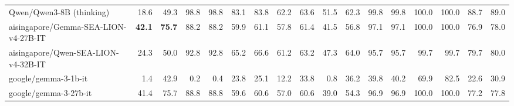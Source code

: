 \documentclass{article}
\begin{document}
\begin{table}[htbp]
\begin{threeparttable}
\begin{adjustbox}{max width=\textwidth}
\begin{tabular}{lrrrrrrrrrrrrrrrr}
Qwen/Qwen3-8B (thinking) & \cellcolor[HTML]{FDF4F0}18.6 & \cellcolor[HTML]{EFF6FA}49.3 & \cellcolor[HTML]{93C5DE}98.8 & \cellcolor[HTML]{93C5DE}98.8 & \cellcolor[HTML]{A1CDE2}83.1 & \cellcolor[HTML]{A5CFE4}83.8 & \cellcolor[HTML]{ADD3E6}62.2 & \cellcolor[HTML]{B1D5E7}63.6 & \cellcolor[HTML]{95C6DF}51.5 & \cellcolor[HTML]{A4CEE3}62.3 & \cellcolor[HTML]{92C5DE}99.8 & \cellcolor[HTML]{92C5DE}99.8 & \cellcolor[HTML]{92C5DE}100.0 & \cellcolor[HTML]{92C5DE}100.0 & \cellcolor[HTML]{9AC9E0}88.7 & \cellcolor[HTML]{9CCAE1}89.0 \\
aisingapore/Gemma-SEA-LION-v4-27B-IT & \cellcolor[HTML]{92C5DE}\textbf{42.1} & \cellcolor[HTML]{92C5DE}\textbf{75.7} & \cellcolor[HTML]{AAD2E5}88.2 & \cellcolor[HTML]{AAD2E5}88.2 & \cellcolor[HTML]{D9EBF3}59.9 & \cellcolor[HTML]{EFF6FA}61.1 & \cellcolor[HTML]{BBDAEA}57.8 & \cellcolor[HTML]{B8D9E9}61.4 & \cellcolor[HTML]{BFDDEB}41.5 & \cellcolor[HTML]{BEDCEB}56.8 & \cellcolor[HTML]{98C8DF}97.1 & \cellcolor[HTML]{9BCAE0}97.1 & \cellcolor[HTML]{92C5DE}100.0 & \cellcolor[HTML]{92C5DE}100.0 & \cellcolor[HTML]{B6D8E9}76.9 & \cellcolor[HTML]{B9DAEA}78.0 \\
aisingapore/Qwen-SEA-LION-v4-32B-IT & \cellcolor[HTML]{EEF6F9}24.3 & \cellcolor[HTML]{EDF5F9}50.0 & \cellcolor[HTML]{A0CCE2}92.8 & \cellcolor[HTML]{A0CCE2}92.8 & \cellcolor[HTML]{CCE4EF}65.2 & \cellcolor[HTML]{DDEDF4}66.6 & \cellcolor[HTML]{B0D5E7}61.2 & \cellcolor[HTML]{B2D6E7}63.2 & \cellcolor[HTML]{A6D0E4}47.3 & \cellcolor[HTML]{9CCAE1}64.0 & \cellcolor[HTML]{9BC9E0}95.7 & \cellcolor[HTML]{A0CCE2}95.7 & \cellcolor[HTML]{92C5DE}99.7 & \cellcolor[HTML]{94C6DE}99.7 & \cellcolor[HTML]{B0D5E7}79.7 & \cellcolor[HTML]{B4D7E8}80.0 \\
google/gemma-3-1b-it & \cellcolor[HTML]{F4AB8A}1.4 & \cellcolor[HTML]{FEF8F6}42.9 & \cellcolor[HTML]{F4A582}0.2 & \cellcolor[HTML]{F4A582}0.4 & \cellcolor[HTML]{F9D4C4}23.8 & \cellcolor[HTML]{F4AB8A}25.1 & \cellcolor[HTML]{F7C3AC}12.2 & \cellcolor[HTML]{FCEAE2}33.8 & \cellcolor[HTML]{F4A785}0.8 & \cellcolor[HTML]{FBE1D6}36.2 & \cellcolor[HTML]{FCECE5}39.8 & \cellcolor[HTML]{F5B598}40.2 & \cellcolor[HTML]{D3E7F1}69.9 & \cellcolor[HTML]{FDF6F3}82.5 & \cellcolor[HTML]{F9D0BE}22.6 & \cellcolor[HTML]{F9D1BF}30.9 \\
google/gemma-3-27b-it & \cellcolor[HTML]{95C6DF}41.4 & \cellcolor[HTML]{92C5DE}75.7 & \cellcolor[HTML]{A9D1E5}88.8 & \cellcolor[HTML]{A9D1E5}88.8 & \cellcolor[HTML]{DAEBF3}59.6 & \cellcolor[HTML]{F1F7FA}60.6 & \cellcolor[HTML]{BDDCEB}57.0 & \cellcolor[HTML]{BBDBEA}60.6 & \cellcolor[HTML]{C9E2EE}39.0 & \cellcolor[HTML]{CAE3EF}54.3 & \cellcolor[HTML]{98C8DF}96.9 & \cellcolor[HTML]{9CCAE1}96.9 & \cellcolor[HTML]{92C5DE}100.0 & \cellcolor[HTML]{92C5DE}100.0 & \cellcolor[HTML]{B6D8E8}77.2 & \cellcolor[HTML]{BADAEA}77.8 \\

\end{tabular}
\end{adjustbox}
\end{threeparttable}
\end{table}
\end{document}
